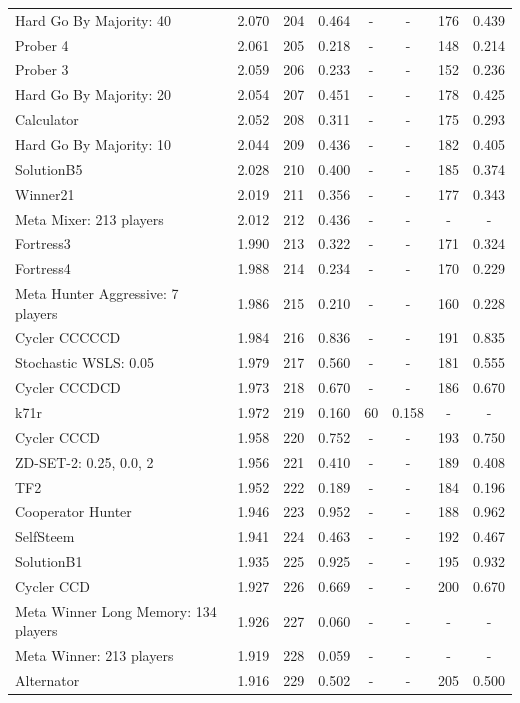 \begin{tabular}{lccccccc}
Hard Go By Majority: 40 & 2.070 & 204 & 0.464 & - & - & 176 & 0.439 \\
Prober 4 & 2.061 & 205 & 0.218 & - & - & 148 & 0.214 \\
Prober 3 & 2.059 & 206 & 0.233 & - & - & 152 & 0.236 \\
Hard Go By Majority: 20 & 2.054 & 207 & 0.451 & - & - & 178 & 0.425 \\
Calculator & 2.052 & 208 & 0.311 & - & - & 175 & 0.293 \\
Hard Go By Majority: 10 & 2.044 & 209 & 0.436 & - & - & 182 & 0.405 \\
SolutionB5 & 2.028 & 210 & 0.400 & - & - & 185 & 0.374 \\
Winner21 & 2.019 & 211 & 0.356 & - & - & 177 & 0.343 \\
Meta Mixer: 213 players & 2.012 & 212 & 0.436 & - & - & - & - \\
Fortress3 & 1.990 & 213 & 0.322 & - & - & 171 & 0.324 \\
Fortress4 & 1.988 & 214 & 0.234 & - & - & 170 & 0.229 \\
Meta Hunter Aggressive: 7 players & 1.986 & 215 & 0.210 & - & - & 160 & 0.228 \\
Cycler CCCCCD & 1.984 & 216 & 0.836 & - & - & 191 & 0.835 \\
Stochastic WSLS: 0.05 & 1.979 & 217 & 0.560 & - & - & 181 & 0.555 \\
Cycler CCCDCD & 1.973 & 218 & 0.670 & - & - & 186 & 0.670 \\
k71r & 1.972 & 219 & 0.160 & 60 & 0.158 & - & - \\
Cycler CCCD & 1.958 & 220 & 0.752 & - & - & 193 & 0.750 \\
ZD-SET-2: 0.25, 0.0, 2 & 1.956 & 221 & 0.410 & - & - & 189 & 0.408 \\
TF2 & 1.952 & 222 & 0.189 & - & - & 184 & 0.196 \\
Cooperator Hunter & 1.946 & 223 & 0.952 & - & - & 188 & 0.962 \\
SelfSteem & 1.941 & 224 & 0.463 & - & - & 192 & 0.467 \\
SolutionB1 & 1.935 & 225 & 0.925 & - & - & 195 & 0.932 \\
Cycler CCD & 1.927 & 226 & 0.669 & - & - & 200 & 0.670 \\
Meta Winner Long Memory: 134 players & 1.926 & 227 & 0.060 & - & - & - & - \\
Meta Winner: 213 players & 1.919 & 228 & 0.059 & - & - & - & - \\
Alternator & 1.916 & 229 & 0.502 & - & - & 205 & 0.500 \\

\end{tabular}
